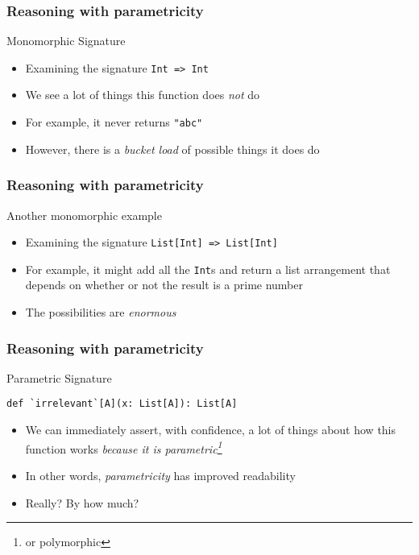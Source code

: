 \begin{frame}[fragile]
\frametitle{Reasoning with parametricity}
\begin{block}{Monomorphic Signature}
\begin{itemize}
  \item Examining the signature \lstinline[style=scala]{Int => Int}
  \item We see a lot of things this function does \emph{not} do
  \item For example, it never returns \lstinline[style=scala]{"abc"}
  \item However, there is a \emph{bucket load} of possible things it does do
\end{itemize}
\end{block}
\end{frame}

\begin{frame}[fragile]
\frametitle{Reasoning with parametricity}
\begin{block}{Another monomorphic example}
\begin{itemize}
  \item Examining the signature \lstinline[style=scala]{List[Int] => List[Int]}
  \item For example, it might add all the \lstinline{Int}s and return a list arrangement that depends on whether or not the result is a prime number
  \item The possibilities are \emph{enormous}
\end{itemize}
\end{block}
\end{frame}

\begin{frame}[fragile]
\frametitle{Reasoning with parametricity}
\begin{block}{Parametric Signature}
\begin{lstlisting}[style=scala]
def `irrelevant`[A](x: List[A]): List[A]
\end{lstlisting}
\begin{itemize}
  \item We can immediately assert, with confidence, a lot of things about how this function works \emph{because it is parametric\footnote{or polymorphic}}
  \item<2> In other words, \emph{parametricity} has improved readability
  \item<2> Really? By how much?
\end{itemize}
\end{block}
\end{frame}

